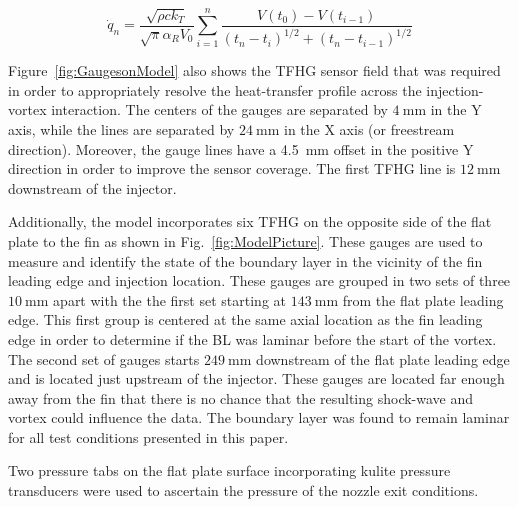 \documentclass{AIAA}
\begin{document}
\begin{equation}
\dot{q}_n = \frac{\sqrt{\rho c k_T}}{\sqrt{\pi}\alpha_R V_0}\sum^n_{i=1}\frac{V\left(t_0\right)-V\left(t_{i-1}\right)}{\left(t_n-t_i\right)^{1/2}+\left(t_n-t_{i-1}\right)^{1/2}}
\label{eq:TFHG_Heat} 
\end{equation}



Figure~\ref{fig:GaugesonModel} also shows the TFHG sensor field that was required in order to appropriately resolve the heat-transfer profile across the injection-vortex interaction.
The centers of the gauges are separated by $\SI{4}{\milli\meter}$ in the Y axis, while the lines are separated by $\SI{24}{\milli\meter}$ in the X axis (or freestream direction).
Moreover, the gauge lines have a \SI{4.5}{\milli\meter} offset in the positive Y direction in order to improve the sensor coverage.
The first TFHG line is $\SI{12}{\milli\meter}$ downstream of the injector.


Additionally, the model incorporates six TFHG on the opposite side of the  flat plate to the fin as shown in Fig.~\ref{fig:ModelPicture}.
These gauges are used to measure and identify the state of the boundary layer in the vicinity of the fin leading edge and injection location.
These gauges are grouped in two sets of three $\SI{10}{\milli\meter}$ apart with the 
the first set starting at $\SI{143}{\milli\meter}$ from the flat plate leading edge.
This first group is centered at the same axial location as the fin leading edge in order to determine if the BL was laminar before the start of the vortex.
The second set of gauges starts $\SI{249}{\milli\meter}$ downstream of the flat plate leading edge and is located just upstream of the injector.
These gauges are located far enough away from the fin that there is no chance that the resulting shock-wave and vortex could influence the data.
The boundary layer was found to remain laminar for all test conditions presented in this paper.

Two pressure tabs on the flat plate surface incorporating kulite pressure transducers were used to ascertain the pressure of the nozzle exit conditions.
\end{document}
